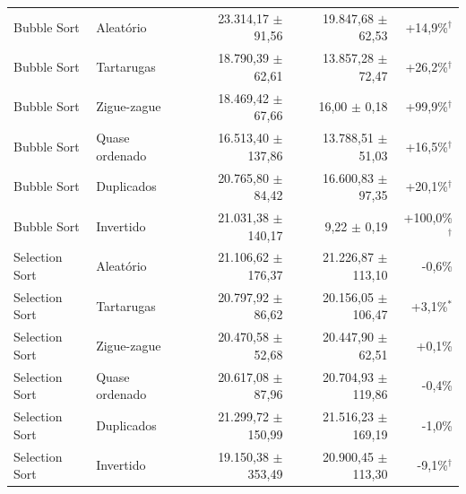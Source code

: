 \begin{tabular}{llrrr}
Bubble Sort & Aleatório & 23.314{,}17 $\pm$ 91{,}56 & 19.847{,}68 $\pm$ 62{,}53 & +14{,}9\%$^{\dagger}$ \\
Bubble Sort & Tartarugas & 18.790{,}39 $\pm$ 62{,}61 & 13.857{,}28 $\pm$ 72{,}47 & +26{,}2\%$^{\dagger}$ \\
Bubble Sort & Zigue-zague & 18.469{,}42 $\pm$ 67{,}66 & 16{,}00 $\pm$ 0{,}18 & +99{,}9\%$^{\dagger}$ \\
Bubble Sort & Quase ordenado & 16.513{,}40 $\pm$ 137{,}86 & 13.788{,}51 $\pm$ 51{,}03 & +16{,}5\%$^{\dagger}$ \\
Bubble Sort & Duplicados & 20.765{,}80 $\pm$ 84{,}42 & 16.600{,}83 $\pm$ 97{,}35 & +20{,}1\%$^{\dagger}$ \\
Bubble Sort & Invertido & 21.031{,}38 $\pm$ 140{,}17 & 9{,}22 $\pm$ 0{,}19 & +100{,}0\%$^{\dagger}$ \\
Selection Sort & Aleatório & 21.106{,}62 $\pm$ 176{,}37 & 21.226{,}87 $\pm$ 113{,}10 & -0{,}6\% \\
Selection Sort & Tartarugas & 20.797{,}92 $\pm$ 86{,}62 & 20.156{,}05 $\pm$ 106{,}47 & +3{,}1\%$^{*}$ \\
Selection Sort & Zigue-zague & 20.470{,}58 $\pm$ 52{,}68 & 20.447{,}90 $\pm$ 62{,}51 & +0{,}1\% \\
Selection Sort & Quase ordenado & 20.617{,}08 $\pm$ 87{,}96 & 20.704{,}93 $\pm$ 119{,}86 & -0{,}4\% \\
Selection Sort & Duplicados & 21.299{,}72 $\pm$ 150{,}99 & 21.516{,}23 $\pm$ 169{,}19 & -1{,}0\% \\
Selection Sort & Invertido & 19.150{,}38 $\pm$ 353{,}49 & 20.900{,}45 $\pm$ 113{,}30 & -9{,}1\%$^{\dagger}$ \\
\hline
\end{tabular}
